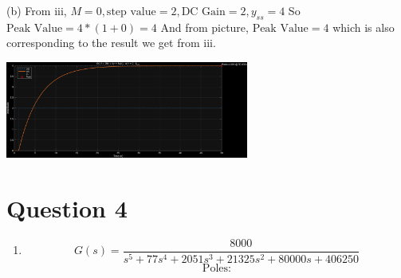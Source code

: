 \documentclass[12pt]{article}
\begin{document}
\begin{enumerate}[label=\roman*.]
        (b) From iii, $M = 0, \text{step value} = 2, \text{DC Gain}
        =2, y_{ss} = 4$
        So $\text{Peak Value} = 4 * (1+0) = 4$
        And from picture, $\text{Peak Value} = 4$ which is also corresponding to
        the result we get from iii.
        \begin{center}
            \includegraphics[width=0.6\textwidth]{Q3b.png}
        \end{center}

    \end{enumerate}

\section*{Question 4}
    \begin{enumerate}[label=\alph*]
        \item \[G(s) = \frac{8000}{s^5+77s^4+2051s^3+21325s^2+80000s+406250}\]
        \[\text{Poles:} \]

    \end{enumerate}
\end{document}
